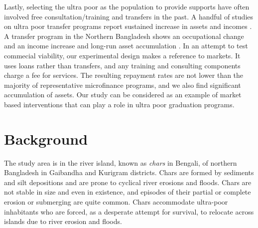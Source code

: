 	Lastly, selecting the ultra poor as the population to provide supports have often involved free consultation/training and transfers in the past. A handful of studies on ultra poor transfer programs report sustained increase in assets and incomes \citep{Blattman2014, BanerjeeetalScience2015, Blattmanetal2016, HaushoferShapiro2016}. A transfer program in the Northern Bangladesh shows an occupational change and an income increase \citep{BandieraBRAC2017} and long-run asset accumulation \citep{Balboni2020}. %
	In an attempt to test commecial viability, our experimental design makes a reference to markets. It uses loans rather than transfers, and any training and consulting components charge a fee for services. The resulting repayment rates are not lower than the majority of representative microfinance programs, and we also find significant accumulation of assets. Our study can be considered as an example of market based interventions that can play a role in ultra poor graduation programs.


\section{Background}
\label{SecBackground}


	The study area is in the river island, known as \textit{chars} in Bengali, of northern Bangladesh in Gaibandha and Kurigram districts. Chars are formed by sediments and silt depositions and are prone to cyclical river erosions and floods. Chars are not stable in size and even in existence, and episodes of their partial or complete erosion or submerging are quite common. Chars accommodate ultra-poor inhabitants who are forced, as a desperate attempt for survival, to relocate across islands due to river erosion and floods.

